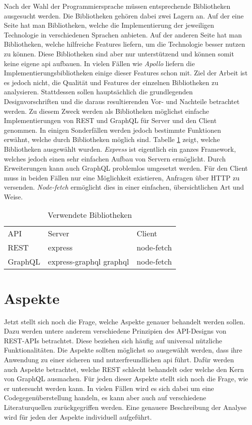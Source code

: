Nach der Wahl der Programmiersprache müssen entsprechende Bibliotheken ausgesucht werden. Die Bibliotheken gehören dabei zwei Lagern an. Auf der eine Seite hat man Bibliotheken, welche die Implementierung der jeweiligen Technologie in verschiedenen Sprachen anbieten. Auf der anderen Seite hat man Bibliotheken, welche hilfreiche Features liefern, um die Technologie besser nutzen zu können. Diese Bibliotheken sind aber nur unterstützend und  können somit keine eigene \ac{api} aufbauen. In vielen Fällen wie \textit{Apollo}  liefern die Implementierungsbibliotheken einige dieser Features schon mit. Ziel der Arbeit ist es jedoch nicht, die Qualität und Features der einzelnen Bibliotheken zu analysieren. Stattdessen sollen hauptsächlich die grundlegenden Designvorschriften und die daraus resultierenden Vor- und Nachteile betrachtet werden. Zu diesem Zweck werden als Bibliotheken möglichst einfache Implementierungen von \ac{REST} und GraphQL für Server und den Client genommen. In einigen Sonderfällen werden jedoch bestimmte Funktionen erwähnt, welche durch Bibliotheken möglich sind. Tabelle \ref{tab:Bibliotheken} zeigt, welche Bibliotheken ausgewählt wurden. \textit{Express} ist eigentlich ein ganzes Framework, welches jedoch einen sehr einfachen Aufbau von Servern ermöglicht. Durch Erweiterungen kann auch GraphQL problemlos umgesetzt werden. Für den Client muss in beiden Fällen nur eine Möglichkeit existieren, Anfragen über \ac{HTTP} zu versenden. \textit{Node-fetch} ermöglicht dies in einer einfachen, übersichtlichen Art und Weise. 

\begin{table}
\begin{tabular}{p{3cm} p{3cm} p{3cm}}
API & Server & Client \\
REST & express & node-fetch \\
GraphQL & express-graphql graphql & node-fetch \\
\end{tabular}
\caption{Verwendete Bibliotheken}
\label{tab:Bibliotheken}
\end{table}

\section{Aspekte}\label{aspekte}

Jetzt stellt sich noch die Frage, welche Aspekte genauer behandelt werden sollen. Dazu werden untere anderem verschiedene Prinzipien des API-Designs von REST-APIs betrachtet. Diese beziehen sich häufig auf universal nützliche Funktionalitäten. Die Aspekte sollten möglichst so ausgewählt werden, dass ihre Anwendung zu einer sicheren und nutzerfreundlichen \ac{api} führt. Dafür werden auch Aspekte betrachtet, welche \ac{REST} schlecht behandelt oder welche den Kern von GraphQL ausmachen. Für jeden dieser Aspekte stellt sich noch die Frage,  wie er untersucht werden kann. In vielen Fällen wird es sich dabei um eine Codegegenüberstellung handeln, es kann aber auch auf verschiedene Literaturquellen zurückgegriffen werden. Eine genauere Beschreibung der Analyse wird für jeden der Aspekte individuell aufgeführt.

